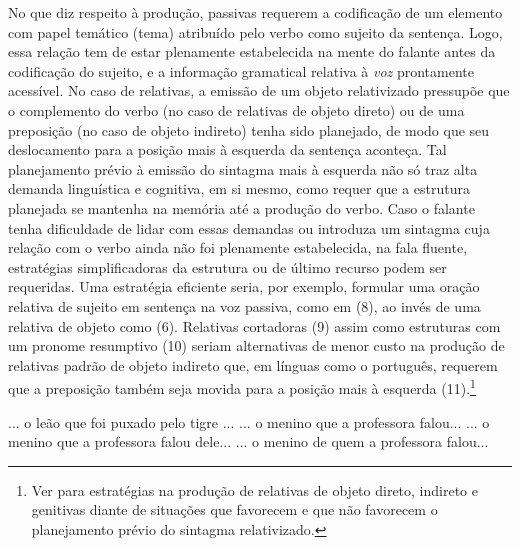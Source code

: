 \documentclass[output=paper,colorlinks,citecolor=brown,booklanguage=portuguese]{langscibook}
\begin{document}
No que diz respeito à produção, passivas requerem a codificação de um elemento com papel temático (tema) atribuído pelo verbo como sujeito da sentença. Logo, essa relação tem de estar plenamente estabelecida na mente do falante antes da codificação do sujeito, e a informação gramatical relativa à \emph{voz} prontamente acessível. No caso de relativas, a emissão de um objeto relativizado pressupõe que o complemento do verbo (no caso de relativas de objeto direto) ou de uma preposição (no caso de objeto indireto) tenha sido planejado, de modo que seu deslocamento para a posição mais à esquerda da sentença aconteça. Tal planejamento prévio à emissão do sintagma mais à esquerda não só traz alta demanda linguística e cognitiva, em si mesmo, como requer que a estrutura planejada se mantenha na memória até a produção do verbo. Caso o falante tenha dificuldade de lidar com essas demandas ou introduza um sintagma cuja relação com o verbo ainda não foi plenamente estabelecida, na fala fluente, estratégias simplificadoras da estrutura ou de último recurso podem ser requeridas. Uma estratégia eficiente seria, por exemplo, formular uma oração relativa de sujeito em sentença na voz passiva, como em (8), ao invés de uma relativa de objeto como (6). Relativas cortadoras (9) assim como estruturas com um pronome resumptivo (10) seriam alternativas de menor custo na produção de relativas padrão de objeto indireto que, em línguas como o português, requerem que a preposição  também seja movida para a posição mais à esquerda (11).\footnote{Ver \citet{Correa2018} para estratégias na produção de relativas de objeto direto, indireto e genitivas diante de situações que favorecem e que não favorecem o planejamento prévio do sintagma relativizado.}


\ea\label{ex:14:8}	 ... o leão que foi puxado pelo tigre ...
\z
\ea\label{ex:14:9} 	... o menino que a professora falou...
\z
\ea\label{ex:14:10} 	... o menino que a professora falou dele...
\z
\ea\label{ex:14:11} 	... o menino de quem a professora falou...
\z
\end{document}
